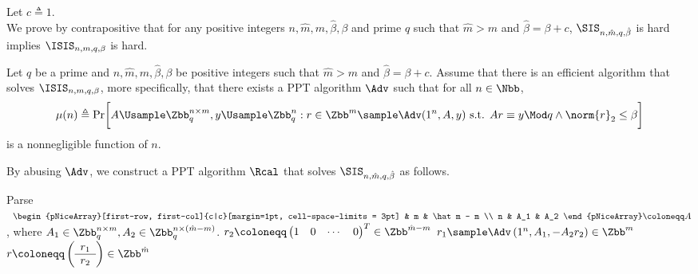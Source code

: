 \begin{answer}[ii]
    Let $c\triangleq 1$.\\
    We prove by contrapositive that for any positive integers $n,\hat{m},m,\hat\beta, \beta$ and prime $q$ such that $\hat m\gt m$ and $\hat\beta=\beta+c$, $\SIS_{n, \hat{m},q, \hat{\beta}}$ is hard implies $\ISIS_{n,m,q,\beta}$ is hard. 
    
    Let $q$ be a prime and $n,\hat{m},m,\hat\beta, \beta$ be positive integers such that  $\hat m\gt m$ and $\hat\beta=\beta+c$.
    Assume that there is an efficient algorithm that solves $\ISIS_{n,m,q,\beta}$, more specifically, that there exists a PPT algorithm $\Adv$ such that for all $n\in\Nbb$,
    \begin{equation}\label{eq:p1-2-1}
        \mu(n)\triangleq \Pr\biggl[A\Usample \Zbb_q^{n\times m}, y\Usample\Zbb_q^{n}: r\in\Zbb^m \sample \Adv(1^n, A, y) \textrm{ s.t. } Ar\equiv y\Mod q \land \norm{r}_2\le \beta \biggr]
    \end{equation}
    is a nonnegligible function of $n$.
    
    By abusing $\Adv$, we construct a PPT algorithm $\Rcal$ that solves $\SIS_{n, \hat{m},q, \hat{\beta}}$ as follows.
    \begin{simplebox}
        \noindent
        \begin{algorithmic}[1]
            \State Parse $\;\;
            \begin{pNiceArray}[first-row, first-col]{c|c}[margin=1pt, cell-space-limits = 3pt]
                        & m & \hat m - m \\
                    n   & A_1 & A_2
            \end{pNiceArray}
            \coloneqq A$, where $A_1\in\Zbb_q^{n\times m}, A_2\in\Zbb_q^{n\times (\hat m-m)}$.
            \State $r_2\coloneqq \begin{pmatrix}
                1 & 0 & \cdots & 0
            \end{pmatrix}^T \in \Zbb^{\hat m-m}$
            \State $r_1\sample \Adv\left(1^n, A_1, -A_2r_2\right) \in \Zbb^{m}$
            \State\Return $r\coloneqq \left(\begin{array}{c}
                r_1\\
                \hline
                r_2
            \end{array} \right) \in \Zbb^{\hat m}$
            \EndProcedure
        \end{algorithmic}
    \end{simplebox}


\end{answer}
